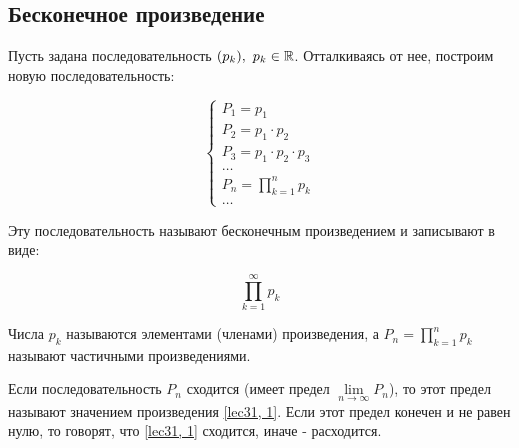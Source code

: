 \documentclass[../../main.tex]{subfiles}
\begin{document}
	\subsection{Бесконечное произведение}

	Пусть задана последовательность $(p_k),\ p_k \in \R$. Отталкиваясь от нее, 
	построим новую последовательность:

	\[
	\begin{cases}
	P_1 = p_1 \\
	P_2 = p_1 \cdot p_2 \\
	P_3 = p_1 \cdot p_2 \cdot p_3 \\
	\ldots \\
	P_n = \prod\limits_{k = 1}^{n} p_k \\
	\ldots
	\end{cases} 
	\]

	Эту последовательность называют бесконечным произведением и записывают в виде:

	\begin{equation} \label{lec31, 1}
		\prod\limits_{k = 1}^{\infty} p_k
	\end{equation}
	
	Числа $p_k$ называются элементами (членами) произведения, а $P_n = 
	\prod\limits_{k = 1}^{n} p_k$ называют частичными произведениями.
	
	Если последовательность $P_n$ сходится (имеет предел $\lim\limits_{n \to 
	\infty}P_n$), то этот предел называют значением произведения \eqref{lec31, 
	1}. Если этот предел конечен и не равен нулю, то говорят, что \eqref{lec31, 
	1} сходится, иначе - расходится.
	
\end{document}
